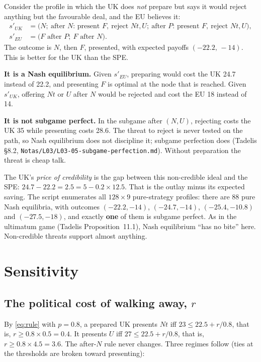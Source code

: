 \documentclass[11pt,a4paper]{article}
\newcommand{\Nt}{\mathit{Nt}}
\newcommand{\dF}{\mathit{F}}
\newcommand{\dU}{\mathit{U}}
\begin{document}
Consider the profile in which the UK does \emph{not} prepare but says it would reject anything but
the favourable deal, and the EU believes it:
\begin{align*}
  s'_{UK} &= \bigl(N;\ \text{after }N\text{: present }\dF,\ \text{reject }\Nt,\dU;\
              \text{after }P\text{: present }\dF,\ \text{reject }\Nt,\dU\bigr),\\
  s'_{EU} &= \bigl(\dF\text{ after }P;\ \dF\text{ after }N\bigr).
\end{align*}
The outcome is $N$, then $\dF$, presented, with expected payoffs $(-22.2,\,-14)$. This is better for the
UK than the SPE.

\textbf{It is a Nash equilibrium.} Given $s'_{EU}$, preparing would cost the UK 24.7 instead of
22.2, and presenting $\dF$ is optimal at the node that is reached. Given $s'_{UK}$, offering $\Nt$ or $\dU$
after $N$ would be rejected and cost the EU 18 instead of 14.

\textbf{It is not subgame perfect.} In the subgame after $(N,\dU)$, rejecting costs the UK 35
while presenting costs 28.6. The threat to reject is never tested on the path, so Nash
equilibrium does not discipline it; subgame perfection does (Tadelis \S8.2,
\texttt{Notas/L03/L03-05-subgame-perfection.md}). Without preparation the threat is cheap talk.

The UK's \emph{price of credibility} is the gap between this non-credible ideal and the SPE:
$24.7-22.2=2.5=5-0.2\times12.5$. That is the outlay minus its expected saving. The script
enumerates all $128\times9$ pure-strategy profiles: there are 88 pure Nash equilibria, with outcomes
$(-22.2,-14)$, $(-24.7,-14)$, $(-25.4,-10.8)$ and $(-27.5,-18)$, and exactly \textbf{one} of them is
subgame perfect. As in the ultimatum game (Tadelis Proposition~11.1), Nash equilibrium
``has no bite'' here. Non-credible threats support almost anything.

\section{Sensitivity}

\subsection{\texorpdfstring{The political cost of walking away, $r$}{The political cost of walking away, r}}

By \eqref{eq:rule} with $p=0.8$, a prepared UK presents $\Nt$ iff $23\le22.5+r/0.8$, that is,
$r\ge0.8\times0.5=0.4$. It presents $\dU$ iff $27\le22.5+r/0.8$, that is, $r\ge0.8\times4.5=3.6$.
The after-$N$ rule never changes. Three regimes follow (ties at the thresholds are broken
toward presenting):
\end{document}
